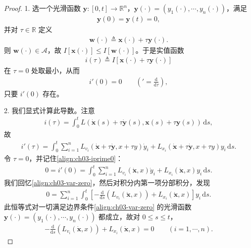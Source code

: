 \documentclass[../../main.tex]{subfiles}
\begin{document}
\begin{proof}
1. 选一个光滑函数 $\mathbf{y}:[0,t]\to\mathbb{R}^n$，$\mathbf{y}(\cdot)=(y_1(\cdot),\cdots,y_n(\cdot))$，满足
\begin{align}\label{align:ch03-var-zero}
\mathbf{y}(0)=\mathbf{y}(t)=0,
\end{align}
并对 $\tau\in\mathbb{R}$ 定义
\begin{align}\label{align:ch03-var}
\mathbf{w}(\cdot)\triangleq\mathbf{x}(\cdot)+\tau\mathbf{y}(\cdot).
\end{align}
则 $\mathbf{w}(\cdot)\in\mathcal{A}$，故 $I[\mathbf{x}(\cdot)]\leqslant I[\mathbf{w}(\cdot)]$。于是实值函数
\begin{align*}
i(\tau)\triangleq I[\mathbf{x}(\cdot)+\tau\mathbf{y}(\cdot)]
\end{align*}
在 $\tau=0$ 处取最小，从而
\begin{align}\label{align:ch03-iprime0}
i'(0)=0 \qquad \left('=\frac{\mathrm{d}}{\mathrm{d}\tau}\right),
\end{align}
只要 $i'(0)$ 存在。

2. 我们显式计算此导数。注意
\begin{align*}
i(\tau)=\int_0^t L(\dot{\mathbf{x}}(s)+\tau\dot{\mathbf{y}}(s),\mathbf{x}(s)+\tau\mathbf{y}(s))\,\mathrm{d}s,
\end{align*}
故
\begin{align*}
i'(\tau)=\int_0^t\sum_{i=1}^n L_{v_i}(\dot{\mathbf{x}}+\tau\dot{\mathbf{y}},x+\tau y)\dot{y}_i+L_{x_i}(\dot{\mathbf{x}}+\tau\dot{\mathbf{y}},x+\tau y)y_i\,\mathrm{d}s.
\end{align*}
令 $\tau=0$，并记住\eqref{align:ch03-iprime0}：
\begin{align*}
0=i'(0)=\int_0^t\sum_{i=1}^n L_{v_i}(\dot{\mathbf{x}},x)\dot{y}_i+L_{x_i}(\dot{\mathbf{x}},x)y_i\,\mathrm{d}s.
\end{align*}
我们回忆\eqref{align:ch03-var-zero}，然后对积分内第一项分部积分，发现
\begin{align*}
0=\sum_{i=1}^n\int_0^t\left[-\frac{\mathrm{d}}{\mathrm{d}s}(L_{v_i}(\dot{\mathbf{x}},x))+L_{x_i}(\dot{\mathbf{x}},x)\right]y_i\,\mathrm{d}s.
\end{align*}
此恒等式对一切满足边界条件\eqref{align:ch03-var-zero} 的光滑函数 $\mathbf{y}(\cdot)=(y_1(\cdot),\cdots,y_n(\cdot))$ 都成立，故对 $0\leqslant s\leqslant t$，
\begin{align*}
-\frac{\mathrm{d}}{\mathrm{d}s}(L_{v_i}(\dot{\mathbf{x}},x))+L_{x_i}(\dot{\mathbf{x}},x)=0 \qquad (i=1,\cdots,n).
\end{align*}
\end{proof}
\end{document}
